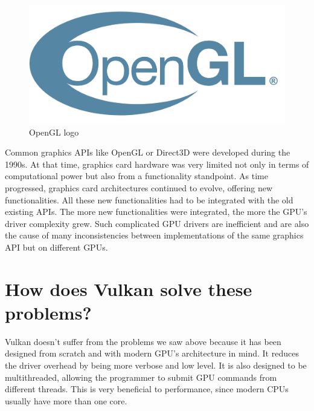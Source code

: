 \begin{figure}
    \begin{center}
        \includegraphics[scale=0.10]{images/ChVulkan/OpenGLLogo.png}
    \end{center}
    \caption{OpenGL logo}
    \label{fig:OpenGLLogo}
\end{figure}

Common graphics APIs like OpenGL or Direct3D were developed during the 1990s.
At that time, graphics card hardware was very limited not only in terms of computational
power but also from a functionality standpoint. As time progressed, graphics card architectures
continued to evolve, offering new functionalities.
All these new functionalities had to be integrated with the old existing APIs.
The more new functionalities were integrated, the more the GPU's driver complexity grew.
Such complicated GPU drivers are inefficient and are also the cause of many
inconsistencies between implementations of the same graphics API but on different GPUs.

\section{How does Vulkan solve these problems?}

Vulkan doesn't suffer from the problems we saw above because it has been designed from scratch
and with modern GPU's architecture in mind.
It reduces the driver overhead by being more verbose and low level.
It is also designed to be multithreaded, allowing the programmer to submit GPU commands from
different threads.
This is very beneficial to performance, since modern CPUs usually have more than one core.
